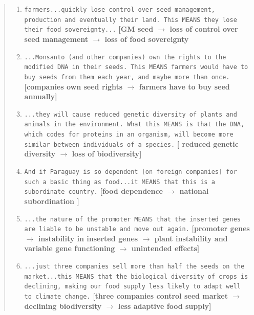 \begin{footnotesize}
\begin{quote}
\begin{enumerate}

  \item \texttt{farmers...quickly lose control over seed management, production and eventually their land. This MEANS they lose their food sovereignty...} \textbf{[GM seed $\rightarrow$ loss of control over seed management $\rightarrow$ loss of food sovereignty}\\
  
  \item \texttt{...Monsanto (and other companies) own the rights to the modified DNA in their seeds. This MEANS farmers would have to buy seeds from them each year, and maybe more than once.} \textbf{[companies own seed rights $\rightarrow$ farmers have to buy seed annually]}\\
  
  \item \texttt{...they will cause reduced genetic diversity of plants and animals in the environment. What this MEANS is that the DNA, which codes for proteins in an organism, will become more similar between individuals of a species.} \textbf{[ reduced genetic diversity $\rightarrow$  loss of biodiversity]}\\
  
  \item \texttt{And if Paraguay is so dependent [on foreign companies] for such a basic thing as food...it MEANS that this is a subordinate country.} \textbf{[food dependence $\rightarrow$ national subordination ]}\\
  
  \item \texttt{...the nature of the promoter MEANS that the inserted genes are liable to be unstable and move out again.} \textbf{[promoter genes $\rightarrow$ instability in inserted genes $\rightarrow$ plant instability and variable gene functioning $\rightarrow$ unintended effects]}\\
  
  \item \texttt{...just three companies sell more than half the seeds on the market...this MEANS that the biological diversity of crops is declining, making our food supply less likely to adapt well to climate change.} \textbf{[three companies control seed market $\rightarrow$ declining biodiversity $\rightarrow$ less adaptive food supply]}\\
  
\end{enumerate}
\end{quote}
\end{footnotesize}

